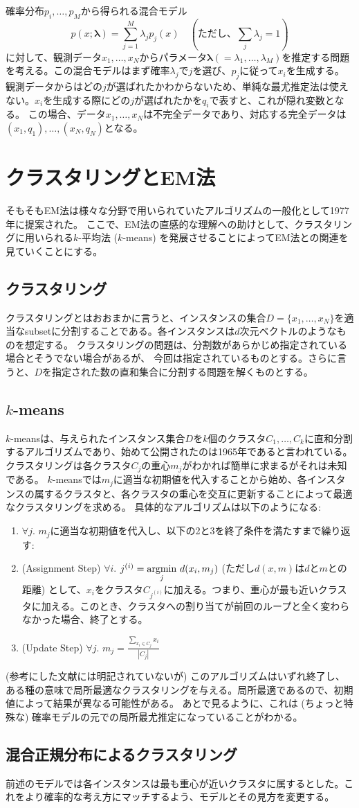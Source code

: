 \documentclass[draft]{jsarticle}
\newcommand{\argmin}{\operatornamewithlimits{argmin}}
\begin{document}
確率分布$p_i, \ldots,
p_M$から得られる混合モデル \[ p(x;\bm{\lambda})= \sum_{j=1}^M \lambda_j p_j(x) \quad
(\text{ただし、} \sum_j \lambda_j =1)
\]
に対して、観測データ$x_1,\ldots,x_N$からパラメータ$\bm{\lambda}
(=\lambda_1,\ldots,\lambda_M)$を推定する問題を考える。この混合モデルはまず確率$\lambda_j$で$j$を選び、$p_j$に従って$x_i$を生成する。
観測データからはどの$j$が選ばれたかわからないため、単純な最尤推定法は使えない。$x_i$を生成する際にどの$j$が選ばれたかを$q_i$で表すと、これが隠れ変数となる。 この場合、データ$x_1,\ldots,x_N$は不完全データであり、対応する完全データは$(x_1,q_1),\ldots,(x_N,q_N)$となる。
\section{クラスタリングとEM法}
そもそもEM法は様々な分野で用いられていたアルゴリズムの一般化として1977年に提案された。
ここで、EM法の直感的な理解への助けとして、クラスタリングに用いられる$k$-平均法 ($k$-means)
を発展させることによってEM法との関連を見ていくことにする。

\subsection{クラスタリング}
クラスタリングとはおおまかに言うと、インスタンスの集合$D=\{x_1,\ldots,x_N\}$を適当なsubsetに分割することである。各インスタンスは$d$次元ベクトルのようなものを想定する。
クラスタリングの問題は、分割数があらかじめ指定されている場合とそうでない場合があるが、
今回は指定されているものとする。さらに言うと、$D$を指定された数の直和集合に分割する問題を解くものとする。
\subsection{$k$-means}
$k$-meansは、与えられたインスタンス集合$D$を$k$個のクラスタ$C_1,\ldots,C_k$に直和分割するアルゴリズムであり、始めて公開されたのは1965年であると言われている。
クラスタリングは各クラスタ$C_j$の重心$m_j$がわかれば簡単に求まるがそれは未知である。
$k$-meansでは$m_j$に適当な初期値を代入することから始め、各インスタンスの属するクラスタと、各クラスタの重心を交互に更新することによって最適なクラスタリングを求める。
具体的なアルゴリズムは以下のようになる:
\begin{enumerate}
  \item $\forall j$. $m_j$に適当な初期値を代入し、以下の2と3を終了条件を満たすまで繰り返す:
  \item (Assignment Step) $\forall i$. $j^{(i)}= {\displaystyle\argmin_j}
  \ d(x_i,m_j)$ (ただし$d(x,m)$は$d$と$m$との距離)
  として、$x_i$をクラスタ$C_{j^{(i)}}$に加える。つまり、重心が最も近いクラスタに加える。このとき、クラスタへの割り当てが前回のループと全く変わらなかった場合、終了とする。
  \item (Update Step) $\forall j$.
  $m_j=\displaystyle\frac{\sum_{x_i \in C_j} x_i}{|C_j|}$
\end{enumerate}
(参考にした文献には明記されていないが)
このアルゴリズムはいずれ終了し、ある種の意味で局所最適なクラスタリングを与える。局所最適であるので、初期値によって結果が異なる可能性がある。
あとで見るように、これは (ちょっと特殊な) 確率モデルの元での局所最尤推定になっていることがわかる。

\subsection{混合正規分布によるクラスタリング}
前述のモデルでは各インスタンスは最も重心が近いクラスタに属するとした。これをより確率的な考え方にマッチするよう、モデルとその見方を変更する。
\end{document}
